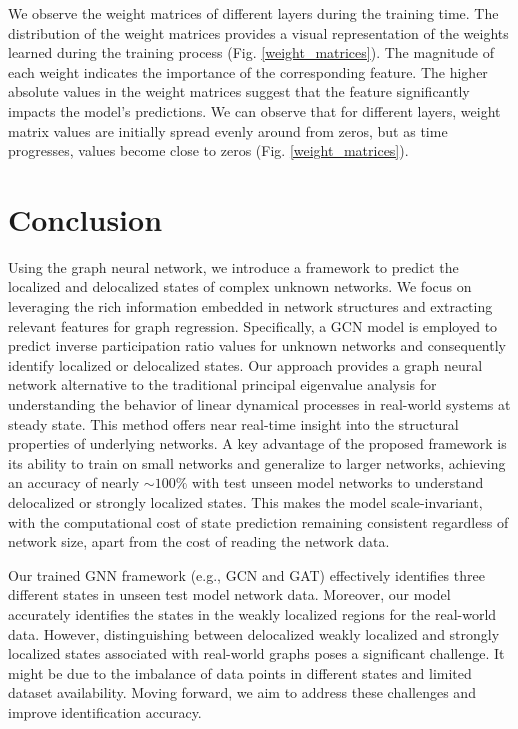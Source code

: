 \documentclass[aps, prd, showpacs, floatfix, superscriptaddress, twocolumn, nofootinbib, preprintnumbers, longbibliography]{revtex4-2}
\begin{document}
We observe the weight matrices of different layers during the training time. The distribution of the weight matrices provides a visual representation of the weights learned during the training process (Fig. \ref{weight_matrices}). The magnitude of each weight indicates the importance of the corresponding feature. The higher absolute values in the weight matrices suggest that the feature significantly impacts the model's predictions. We can observe that for different layers, weight matrix values are initially spread evenly around from zeros, but as time progresses, values become close to zeros (Fig. \ref{weight_matrices}). 

\section{Conclusion}

Using the graph neural network, we introduce a framework to predict the localized and delocalized states of complex unknown networks. We focus on leveraging the rich information embedded in network structures and extracting relevant features for graph regression. Specifically, a GCN model is employed to predict inverse participation ratio values for unknown networks and consequently identify localized or delocalized states. Our approach provides a graph neural network alternative to the traditional principal eigenvalue analysis \cite{loc2017optimized} for understanding the behavior of linear dynamical processes in real-world systems at steady state. This method offers near real-time insight into the structural properties of underlying networks. A key advantage of the proposed framework is its ability to train on small networks and generalize to larger networks, achieving an accuracy of nearly $ \sim 100 \%$ with test unseen model networks to understand delocalized or strongly localized states. This makes the model scale-invariant, with the computational cost of state prediction remaining consistent regardless of network size, apart from the cost of reading the network data. 

Our trained GNN framework (e.g., GCN and GAT) effectively identifies three different states in unseen test model network data. Moreover, our model accurately identifies the states in the weakly localized regions for the real-world data. However, distinguishing between delocalized weakly localized and strongly localized states associated with real-world graphs poses a significant challenge. It might be due to the imbalance of data points in different states and limited dataset availability. Moving forward, we aim to address these challenges and improve identification accuracy.
\end{document}

